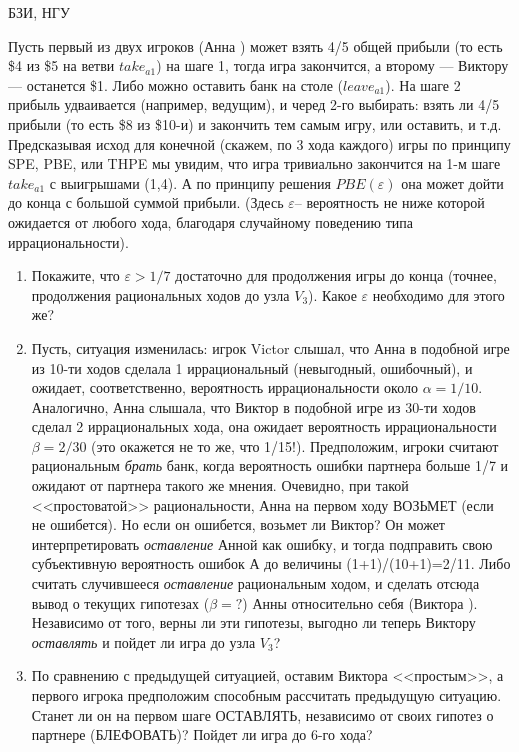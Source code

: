\begin{problem}
\begin{source}
БЗИ, НГУ
\end{source}
Пусть первый из двух игроков (Анна ) может взять 4/5 общей
прибыли (то есть \$4 из \$5 на ветви $take_{a1}$) на шаге
1, тогда игра закончится, а второму --- Виктору --- останется
\$1. Либо можно оставить банк на столе ($leave_{a1}$). На
шаге 2 прибыль удваивается (например, ведущим), и черед
2-го выбирать: взять ли 4/5 прибыли (то есть \$8 из \$10-и)
и закончить тем самым игру, или оставить, и т.д.
Предсказывая исход для конечной (скажем, по 3 хода каждого)
игры по принципу SPE, PBE, или THPE мы увидим, что игра
тривиально закончится на 1-м шаге $take_{a1}$ с выигрышами
(1,4). А по принципу решения $PBE(\varepsilon)$ она может
дойти до конца с большой суммой прибыли. (Здесь
$\varepsilon$-- вероятность не ниже которой ожидается от
любого хода, благодаря случайному поведению типа
иррациональности).

\begin{enumerate}
\item Покажите, что $\varepsilon >1/7$ достаточно для продолжения
игры до конца (точнее, продолжения рациональных ходов до
узла $V_3$). Какое $\varepsilon$ необходимо для этого же?

\item Пусть, ситуация изменилась: игрок Victor слышал, что Анна
в подобной игре из 10-ти ходов сделала 1 иррациональный
(невыгодный, ошибочный), и ожидает, соответственно,
вероятность иррациональности около $\alpha= 1/10$.
Аналогично,  Анна слышала, что Виктор в подобной игре из
30-ти ходов сделал 2 иррациональных хода, она ожидает
вероятность иррациональности $\beta= 2/30$ (это окажется не
то же, что 1/15!). Предположим, игроки считают рациональным
{\em брать} банк, когда вероятность ошибки партнера больше
1/7 и ожидают от партнера такого же мнения. Очевидно, при
такой <<простоватой>> рациональности, Анна на первом ходу
ВОЗЬМЕТ (если не ошибется). Но если он ошибется, возьмет ли
Виктор? Он может интерпретировать {\em оставление} Анной
как ошибку, и тогда подправить свою субъективную
вероятность ошибок А до величины (1+1)/(10+1)=2/11. Либо
считать случившееся {\em оставление} рациональным ходом, и
сделать отсюда вывод о текущих гипотезах ($\beta=?$) Анны
относительно себя (Виктора ). Независимо от того, верны ли
эти гипотезы, выгодно ли теперь Виктору {\em оставлять} и
пойдет ли игра до узла $V_3$?

\item По сравнению с предыдущей ситуацией, оставим Виктора
<<простым>>, а первого игрока предположим способным
рассчитать предыдущую ситуацию. Станет ли он на первом шаге
ОСТАВЛЯТЬ, независимо от своих гипотез о партнере
(БЛЕФОВАТЬ)? Пойдет ли игра до 6-го хода?


\end{enumerate}
\end{problem}

